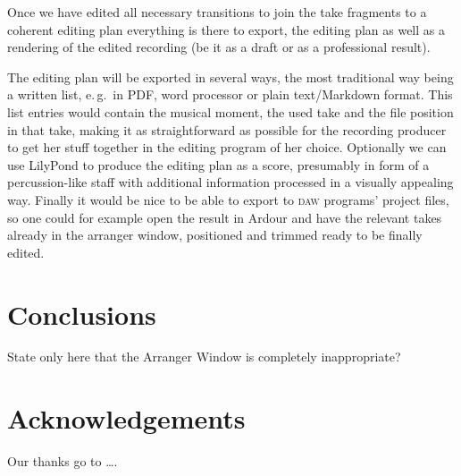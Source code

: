 \documentclass[11pt,a4paper]{article}
\begin{document}
Once we have edited all necessary transitions to join the take fragments to a coherent editing plan everything is there to export, the editing plan as well as a rendering of the edited recording (be it as a draft or as a professional result).

The editing plan will be exported in several ways, the most traditional way being a written list, e.\,g.\ in PDF, word processor or plain text/Markdown format.
This list entries would contain the musical moment, the used take and the file position in that take, making it as straightforward as possible for the recording producer to get her stuff together in the editing program of her choice.
Optionally we can use LilyPond to produce the editing plan as a score, presumably in form of a percussion-like staff with additional information processed in a visually appealing way.
Finally it would be nice to be able to export to \textsc{daw} programs' project files, so one could for example open the result in Ardour and have the relevant takes already in the arranger window, positioned and trimmed ready to be finally edited.


\section{Conclusions}

State only here that the Arranger Window is completely inappropriate?


\section{Acknowledgements}

Our thanks go to \ldots .
\end{document}
